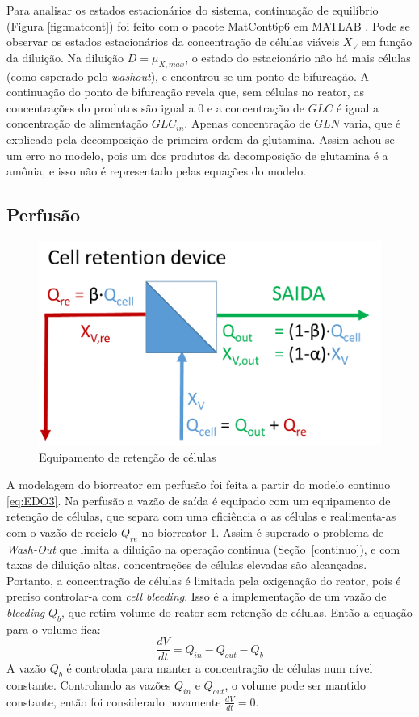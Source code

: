\documentclass[fleqn,10pt]{SelfArx} %
\begin{document}
Para analisar os estados estacionários do sistema, continuação de equilíbrio (Figura \ref{fig:matcont}) foi feito com o pacote MatCont6p6 em MATLAB \cite{Dhooge2003}. Pode se observar os estados estacionários da concentração de células viáveis $X_V$ em função da diluição. Na diluição $D=\mu _{X,max}$, o estado do estacionário não há mais células (como esperado pelo \textit{washout}), e encontrou-se um ponto de bifurcação. A continuação do ponto de bifurcação revela que, sem células no reator, as concentrações do produtos são igual a \num{0} e a concentração de $GLC$ é igual a concentração de alimentação $GLC_{in}$. Apenas concentração de $GLN$ varia, que é explicado pela decomposição de primeira ordem da glutamina. Assim achou-se um erro no modelo, pois um dos produtos da decomposição de glutamina é a amônia, e isso não é representado pelas equações do modelo.

\subsection{Perfusão} \label{perfusion}
\begin{figure}[ht]\centering
	\includegraphics[width=\linewidth]{cellretention}
	\caption{Equipamento de retenção de células}
	\label{fig:cellretention}
\end{figure}

A modelagem do biorreator em perfusão foi feita a partir do modelo continuo \ref{eq:EDO3}. Na perfusão a vazão de saída é equipado com um equipamento de retenção de células, que separa com uma eficiência $\alpha$ as células e realimenta-as com o vazão de reciclo $Q_{re}$ no biorreator \ref{fig:cellretention}. Assim é superado o problema de \textit{Wash-Out} que limita a diluição na operação continua (Seção~\ref{continuo}), e com taxas de diluição altas, concentrações de células elevadas são alcançadas. Portanto, a concentração de células é limitada pela oxigenação do reator, pois é preciso controlar-a com \textit{cell bleeding}. Isso é a implementação de um vazão de \textit{bleeding} $Q_b$, que retira volume do reator sem retenção de células. Então a equação para o volume fica:
\begin{equation}
\frac{dV}{dt} = Q_{in} - Q_{out} - Q_b \label{eq:Vperf}
\end{equation}
 A vazão $Q_b$ é controlada para manter a concentração de células num nível constante. Controlando as vazões $Q_{in}$ e $Q_{out}$, o volume pode ser mantido constante, então foi considerado novamente $\frac{dV}{dt} = 0$.
 
\end{document}
